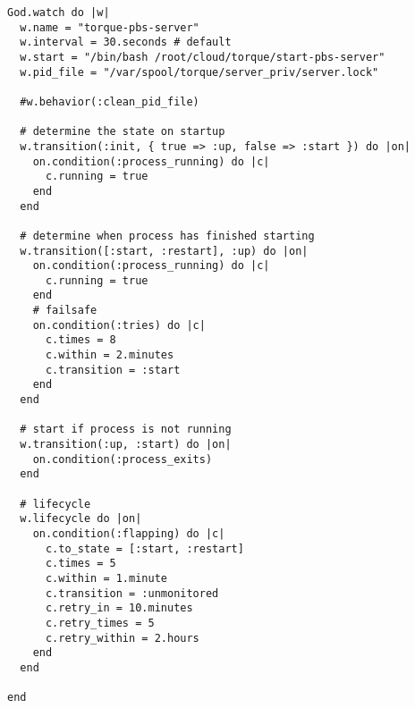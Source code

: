 \begin{lstlisting}
God.watch do |w|
  w.name = "torque-pbs-server"
  w.interval = 30.seconds # default      
  w.start = "/bin/bash /root/cloud/torque/start-pbs-server"
  w.pid_file = "/var/spool/torque/server_priv/server.lock"
    
  #w.behavior(:clean_pid_file)
  
  # determine the state on startup    
  w.transition(:init, { true => :up, false => :start }) do |on|      
    on.condition(:process_running) do |c|        
      c.running = true     
    end    
  end     

  # determine when process has finished starting    
  w.transition([:start, :restart], :up) do |on|      
    on.condition(:process_running) do |c|        
      c.running = true      
    end       
    # failsafe      
    on.condition(:tries) do |c|        
      c.times = 8        
      c.within = 2.minutes        
      c.transition = :start      
    end    
  end     

  # start if process is not running    
  w.transition(:up, :start) do |on|      
    on.condition(:process_exits)    
  end     

  # lifecycle    
  w.lifecycle do |on|      
    on.condition(:flapping) do |c|        
      c.to_state = [:start, :restart]        
      c.times = 5        
      c.within = 1.minute        
      c.transition = :unmonitored        
      c.retry_in = 10.minutes        
      c.retry_times = 5        
      c.retry_within = 2.hours      
    end    
  end
  
end
\end{lstlisting}
